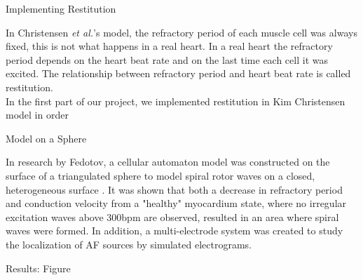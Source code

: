 \documentclass[final,hyperref={pdfpagelabels=false}]{beamer}
\begin{document}
\begin{frame}[t]
\begin{column}{.03\textwidth}\end{column} %
 
\begin{column}{.465\textwidth} %




\begin{block}{Implementing Restitution }

In Christensen \emph{et al.}'s model, the refractory period of each muscle cell was always fixed, this is not what happens in a real heart.
In a real heart the refractory period depends on the heart beat rate and on the last time each cell it was excited. The relationship between refractory period and heart beat rate is called restitution.
\\
In the first part of our project, we implemented restitution in Kim Christensen model in order

\end{block}



\begin{block}{Model on a Sphere}


\begin{itemize}
In research by Fedotov, a cellular automaton model was constructed on the surface of a triangulated sphere to model spiral rotor waves on a closed, heterogeneous surface \cite{Fedotov}. It was shown that both a decrease in refractory period and conduction velocity from a "healthy" myocardium state, where no irregular excitation waves above 300bpm are observed, resulted in an area where spiral waves were formed. In addition, a multi-electrode system was created to study the localization of AF sources by simulated electrograms. 
\end{itemize}

\end{block}

\begin{block}{Results: Figure}


\end{block}
\end{column}
\end{frame}
\end{document}
